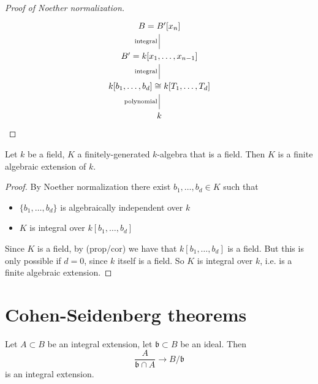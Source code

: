 \documentclass[12pt]{article}
\begin{document}
\begin{proof}[Proof of Noether normalization]
\begin{equation*}
\begin{tikzcd}
{B=B'[x_n]}                                                                    \\
{B'=k[x_1,\dots,x_{n-1}]} \arrow[u, "\text{integral}", no head]                         \\
{k[b_1,\dots,b_d]\cong k[T_1,\dots,T_d]} \arrow[u, "\text{integral}", no head] \\
k \arrow[u, "\text{polynomial}", no head]                                     
\end{tikzcd}
	\end{equation*}
\end{proof}

\begin{lemma}
	Let $k$ be a field, $K$ a finitely-generated $k$-algebra that is a field. Then $K$ is a finite algebraic extension of $k$.
\end{lemma}
\begin{proof}
	By Noether normalization there exist $b_1,\dots,b_d\in K$ such that 
	\begin{itemize}
		\item $\{b_1,\dots,b_d\}$ is algebraically independent over $k$
		\item $K$ is integral over $k[b_1,\dots,b_d]$
	\end{itemize}
	Since $K$ is a field, by (prop/cor) we have that $k[b_1,\dots,b_d]$ is a field. But this is only possible if $d=0$, since $k$ itself is a field. So $K$ is integral over $k$, i.e. is a finite algebraic extension.
\end{proof}


\section{Cohen-Seidenberg theorems} %

\begin{proposition}
\label{prop_quotient_of_integral_ext_is_integral}
	Let $A\subset B$ be an integral extension, let $\mathfrak{b}\subset B$ be an ideal. Then 
	\begin{equation*}
		\frac{A}{\mathfrak{b}\cap A} \to B/\mathfrak{b}
	\end{equation*}
	is an integral extension.
\end{proposition}
\end{document}
